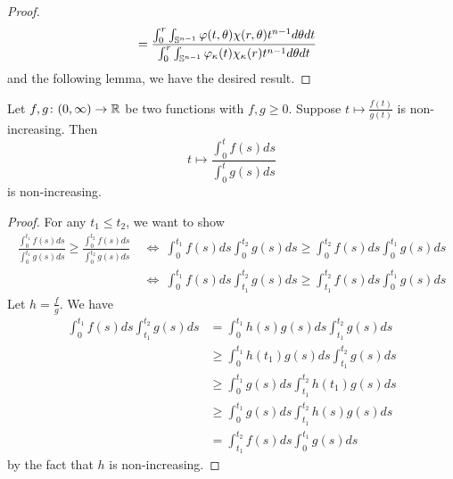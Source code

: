 \begin{enumerate}[label=\arabic{*}]
\begin{proof}
\begin{equation*}
\begin{aligned}
				&= \frac{\int_0^{r} \int_{\mathbb{S}^{n-1}}\varphi(t,\theta)\chi(r,\theta) t^{n-1}d\theta dt}{\int_0^{r}\int_{\mathbb{S}^{n-1}}\varphi_\kappa(t)\chi_\kappa(r) t^{n-1}d\theta dt}
			\end{aligned}
		\end{equation*}
		and the following lemma, we have the desired result.
	\end{proof}
	\begin{lem}
		Let $f,g \colon (0,\infty) \rightarrow \mathbb{R}$ be two functions with $f,g \geq 0$. Suppose $t \mapsto \frac{f(t)}{g(t)}$ is non-increasing. Then
		\begin{equation*}
			t \mapsto \frac{\int_0^tf(s)ds}{\int_0^tg(s)ds}
		\end{equation*}
		is non-increasing.
	\end{lem}
	\begin{proof}
		For any $t_1 \leq t_2$, we want to show
		\begin{equation*}
			\begin{aligned}
				\frac{\int_0^{t_1}f(s)ds}{\int_0^{t_1}g(s)ds} \geq \frac{\int_0^{t_2}f(s)ds}{\int_0^{t_2}g(s)ds} &~\Leftrightarrow~ \int_0^{t_1}f(s)ds\int_0^{t_2}g(s)ds \geq \int_0^{t_2}f(s)ds\int_0^{t_1}g(s)ds \\
				&~\Leftrightarrow~ \int_0^{t_1}f(s)ds\int_{t_1}^{t_2}g(s)ds \geq \int_{t_1}^{t_2}f(s)ds\int_0^{t_1}g(s)ds
			\end{aligned}
		\end{equation*}
		Let $h = \frac{f}{g}$. We have
		\begin{equation*}
			\begin{aligned}
				\int_0^{t_1}f(s)ds\int_{t_1}^{t_2}g(s)ds &= \int_0^{t_1}h(s)g(s)ds\int_{t_1}^{t_2}g(s)ds \\
				&\geq \int_0^{t_1}h(t_1)g(s)ds\int_{t_1}^{t_2}g(s)ds \\
				&\geq \int_0^{t_1}g(s)ds\int_{t_1}^{t_2}h(t_1)g(s)ds \\
				&\geq \int_0^{t_1}g(s)ds\int_{t_1}^{t_2}h(s)g(s)ds \\
				&=\int_{t_1}^{t_2}f(s)ds\int_0^{t_1}g(s)ds 
			\end{aligned}
		\end{equation*}
		by the fact that $h$ is non-increasing.
	\end{proof}


\end{enumerate}
